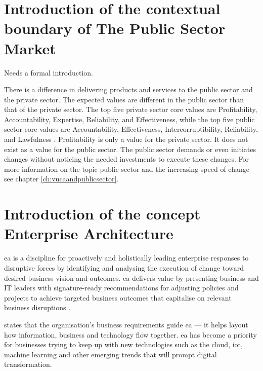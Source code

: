 \section{Introduction of the contextual boundary of The Public Sector Market}
\label{sec:intropublicsector}
\begin{remark}
	Needs a formal introduction.
\end{remark}
There is a difference in delivering products and services to the public sector and the private sector. The expected values are different in the public sector than that of the private sector. The top five private sector core values are  Profitability, Accountability, Expertise, Reliability, and Effectiveness, while the top five public sector core values are Accountability, Effectiveness, Intercorruptibility, Reliability, and Lawfulness \parencite{Wal2008}. Profitability is only a value for the private sector. It does not exist as a value for the public sector.  The public sector demands or even initiates changes without noticing the needed investments to execute these changes. For more information on the topic public sector and the increasing speed of change see chapter \ref{ch:vucaandpublicsector}.

\section{Introduction of the concept Enterprise Architecture}
\label{introea}
\acrfull{ea} is a discipline for proactively and holistically leading enterprise responses to disruptive forces by identifying and analysing the execution of change toward desired business vision and outcomes. \acrshort{ea} delivers value by presenting business and IT leaders with signature-ready recommendations for adjusting policies and projects to achieve targeted business outcomes that capitalise on relevant business disruptions \parencite{Gartner}.\par
\textcite{White2018} states that the organisation’s business requirements guide \acrshort{ea} — it helps layout how information, business and technology flow together. \acrshort{ea} has become a priority for businesses trying to keep up with new technologies such as the cloud, \acrfull{iot}, machine learning and other emerging trends that will prompt digital transformation.

